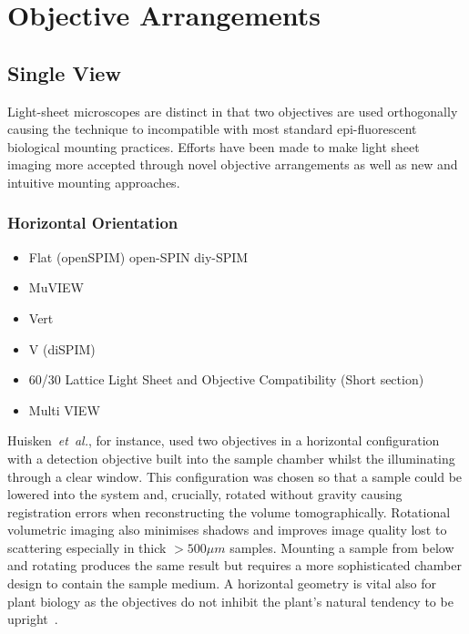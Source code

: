 \section{Objective Arrangements}
\subsection{Single View}
Light-sheet microscopes are distinct in that two objectives are used orthogonally causing the technique to incompatible with most standard epi-fluorescent biological mounting practices.
Efforts have been made to make light sheet imaging more accepted through novel objective arrangements as well as new and intuitive mounting approaches.

\subsubsection{Horizontal Orientation}

\begin{itemize}
	\item[\checked]  Flat (openSPIM) open-SPIN diy-SPIM
				\item[\checked] MuVIEW\cite{swoger_multi-view_2007}%
	\item[\checked] Vert
	\item[\checked] V (diSPIM)
	\item[\checked] 60/30		Lattice Light Sheet and Objective Compatibility (Short section)
	\item[] Multi VIEW
\end{itemize}

Huisken~\emph{et~al.}, for instance, used two objectives in a horizontal configuration with a detection objective built into the sample chamber whilst the illuminating through a clear window.
This configuration was chosen so that a sample could be lowered into the system and, crucially, rotated without gravity causing registration errors when reconstructing the volume tomographically.
Rotational volumetric imaging also minimises shadows and improves image quality lost to scattering especially in thick \(>500 \mu m\) samples.
Mounting a sample from below and rotating produces the same result but requires a more sophisticated chamber design to contain the sample medium.
A horizontal geometry is vital also for plant biology as the objectives do not inhibit the plant's natural tendency to be upright~\cite{wangenheim_rules_2016}. %

